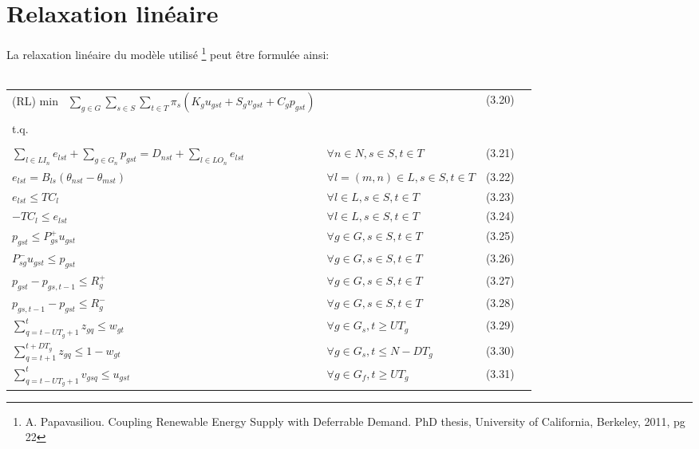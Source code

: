 \vspace*{1.2cm}

\section{Relaxation linéaire}

La relaxation linéaire du modèle utilisé \footnote{A. Papavasiliou. Coupling Renewable Energy Supply with Deferrable Demand. PhD thesis,
University of California, Berkeley, 2011, pg 22} peut être formulée ainsi:\\\\

\begin{tabularx}{\textwidth}{l X r r}
(RL) \hspace{1cm} min \ $\sum\limits_{g \in G} \sum\limits_{s \in S} \sum\limits_{t \in T} \pi_s (K_g u_{gst} + S_g v_{gst} + C_g p_{gst})$ & & (3.20) \\\\
t.q. & \\\\
$\sum\limits_{l \in LI_n} e_{lst} + \sum\limits_{g \in G_n} p_{gst} = D_{nst} + \sum\limits_{l \in LO_n} e_{lst}$ & $\forall n \in N, s \in S, t \in T$ & (3.21) \\
$e_{lst} = B_{ls} (\theta_{nst} - \theta_{mst})$ & $\forall l = (m, n) \in L, s \in S, t \in T$ & (3.22) \\
$e_{lst} \le TC_l$ & $\forall l \in L, s \in S, t \in T$ & (3.23) \\
$-TC_l \le e_{lst}$ & $\forall l \in L, s \in S, t \in T$ & (3.24) \\
$p_{gst} \le P_{gs}^{+} u_{gst}$ & $\forall g \in G, s \in S, t \in T$ & (3.25) \\
$P_{sg}^{-} u_{gst} \le p_{gst}$ & $\forall g \in G, s \in S, t \in T$ & (3.26) \\
$p_{gst} - p_{gs,t-1} \le R_g^{+}$ & $\forall g \in G, s \in S, t \in T$ & (3.27) \\
$p_{gs,t-1} - p_{gst} \le R_g^{-}$ & $\forall g \in G, s \in S, t \in T$ & (3.28) \\
$\sum\limits_{q=t-UT_g+1}^{t} z_{gq} \le w_{gt}$ & $\forall g \in G_s, t \ge UT_g$ & (3.29) \\
$\sum\limits_{q=t+1}^{t+DT_g} z_{gq} \le 1 - w_{gt}$ & $\forall g \in G_s, t \le N - DT_g$ & (3.30) \\
$\sum\limits_{q=t-UT_g+1}^{t} v_{gsq} \le u_{gst}$ & $\forall g \in G_f, t \ge UT_g$ & (3.31) \\

\end{tabularx}
